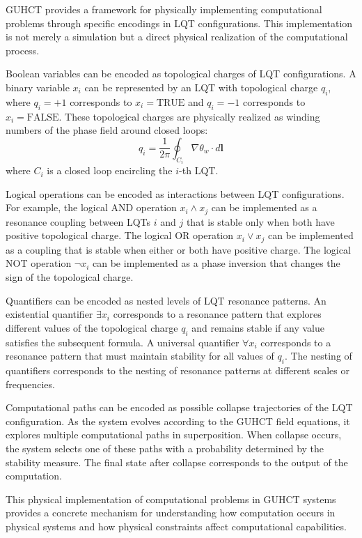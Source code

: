 \documentclass[11pt,a4paper]{article}
\makeatletter
\renewenvironment{proof}[1][\proofname]{\par
  \pushQED{\qed}%
  \normalfont \topsep6\p@\@plus6\p@\relax
  \trivlist
  \item[\hskip\labelsep
        \itshape
    #1\@addpunct{.}]\ignorespaces
}{%
  \popQED\endtrivlist\@endpefalse
}
\makeatother
\begin{document}
\begin{proof}
GUHCT provides a framework for physically implementing computational problems through specific encodings in LQT configurations. This implementation is not merely a simulation but a direct physical realization of the computational process.

Boolean variables can be encoded as topological charges of LQT configurations. A binary variable $x_i$ can be represented by an LQT with topological charge $q_i$, where $q_i = +1$ corresponds to $x_i = \text{TRUE}$ and $q_i = -1$ corresponds to $x_i = \text{FALSE}$. These topological charges are physically realized as winding numbers of the phase field around closed loops:
\begin{equation}
q_i = \frac{1}{2\pi} \oint_{C_i} \nabla \theta_w \cdot d\mathbf{l}
\end{equation}
where $C_i$ is a closed loop encircling the $i$-th LQT.

Logical operations can be encoded as interactions between LQT configurations. For example, the logical AND operation $x_i \land x_j$ can be implemented as a resonance coupling between LQTs $i$ and $j$ that is stable only when both have positive topological charge. The logical OR operation $x_i \lor x_j$ can be implemented as a coupling that is stable when either or both have positive charge. The logical NOT operation $\lnot x_i$ can be implemented as a phase inversion that changes the sign of the topological charge.

Quantifiers can be encoded as nested levels of LQT resonance patterns. An existential quantifier $\exists x_i$ corresponds to a resonance pattern that explores different values of the topological charge $q_i$ and remains stable if any value satisfies the subsequent formula. A universal quantifier $\forall x_i$ corresponds to a resonance pattern that must maintain stability for all values of $q_i$. The nesting of quantifiers corresponds to the nesting of resonance patterns at different scales or frequencies.

Computational paths can be encoded as possible collapse trajectories of the LQT configuration. As the system evolves according to the GUHCT field equations, it explores multiple computational paths in superposition. When collapse occurs, the system selects one of these paths with a probability determined by the stability measure. The final state after collapse corresponds to the output of the computation.

This physical implementation of computational problems in GUHCT systems provides a concrete mechanism for understanding how computation occurs in physical systems and how physical constraints affect computational capabilities.
\end{proof}
\end{document}
